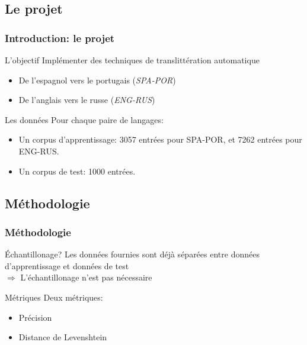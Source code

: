 \documentclass{beamer}
\begin{document}
\subsection{Le projet}
\begin{frame}
\frametitle{Introduction: le projet}

	\begin{block}{L'objectif}
		Implémenter des techniques de translittération automatique
		\begin{itemize}
            \item De l'espagnol vers le portugais (\emph{SPA-POR})
            \item De l'anglais vers le russe (\emph{ENG-RUS})
		\end{itemize}
	\end{block}

	\begin{block}{Les données}
	Pour chaque paire de langages:		
		\begin{itemize}
            \item Un corpus d'apprentissage: 3057 entrées pour SPA-POR, et 7262 entrées pour ENG-RUS.
		\item Un corpus de test: 1000 entrées.
		\end{itemize}		
	\end{block}

\end{frame}

\subsection{Méthodologie}

\begin{frame}
\frametitle{Méthodologie}

	\begin{block}{Échantillonage?}
	Les données fournies sont déjà séparées entre données d'apprentissage et données de test\\
	$\Longrightarrow$ L'échantillonage n'est pas nécessaire
	\end{block}

	\begin{block}{Métriques}
	Deux métriques:
		\begin{itemize}
            \item Précision
            \item Distance de Levenshtein
		\end{itemize}		
	\end{block}
\end{frame}
\end{document}

